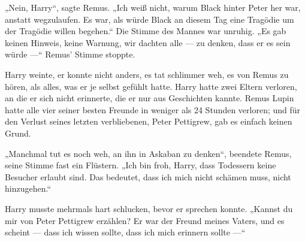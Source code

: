 „Nein, Harry“, sagte Remus.
„Ich weiß nicht, warum Black hinter Peter her war, anstatt wegzulaufen. Es war, als würde Black an diesem Tag eine Tragödie um der Tragödie willen begehen.“ Die Stimme des Mannes war unruhig.
„Es gab keinen Hinweis, keine Warnung, wir dachten alle — zu denken, dass er es sein würde —“ Remus’ Stimme stoppte.

Harry weinte, er konnte nicht anders, es tat schlimmer weh, es von Remus zu hören, als alles, was er je selbst gefühlt hatte. Harry hatte zwei Eltern verloren, an die er sich nicht erinnerte, die er nur aus Geschichten kannte. Remus Lupin hatte alle vier seiner besten Freunde in weniger als 24 Stunden verloren; und für den Verlust seines letzten verbliebenen, Peter Pettigrew, gab es einfach keinen Grund.

„Manchmal tut es noch weh, an ihn in Askaban zu denken“, beendete Remus, seine Stimme fast ein Flüstern.
„Ich bin froh, Harry, dass Todessern keine Besucher erlaubt sind. Das bedeutet, dass ich mich nicht schämen muss, nicht hinzugehen.“

Harry musste mehrmals hart schlucken, bevor er sprechen konnte.
„Kannst du mir von Peter Pettigrew erzählen? Er war der Freund meines Vaters, und es scheint — dass ich wissen sollte, dass ich mich erinnern sollte —“

